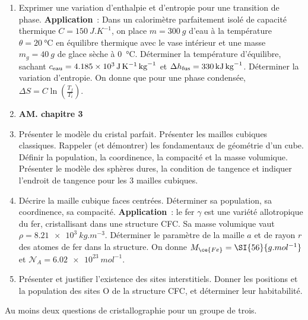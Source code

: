 \documentclass[a4paper, 11pt, final, garamond]{book}
\begin{document}
\begin{enumerate}[label=\sqenumi, resume]
  \item Exprimer une variation d'enthalpie et d'entropie pour une transition
    de phase. \textbf{Application}~: Dans un calorimètre parfaitement isolé de
    capacité thermique $C = \SI{150}{J.K^{-1}}$, on place $m = \SI{300}{g}$
    d'eau à la température $\theta = \SI{20}{\degreeCelsius}$ en équilibre
    thermique avec le vase intérieur et une masse $m_g = \SI{40}{g}$ de glace
    sèche à \SI{0}{\degreeCelsius}. Déterminer la température d'équilibre,
    sachant $c_{\rm eau} = \SI{4.185e3}{J.K^{-1}.kg^{-1}}$ et $\Delta{h_{\rm
    fus}} = \SI{330}{kJ.kg^{-1}}$. Déterminer la variation d'entropie. On
    donne que pour une phase condensée, $\Delta{S} = C \ln \left(
    \frac{T_f}{T_i} \right)$.

  \item[] \textbf{AM. chapitre 3}

  \item Présenter le modèle du cristal parfait. Présenter les mailles cubiques
    classiques. Rappeler (et démontrer) les fondamentaux de géométrie d'un cube.
    Définir la population, la coordinence, la compacité et la masse volumique.
    Présenter le modèle des sphères dures, la condition de tangence et indiquer
    l'endroit de tangence pour les 3 mailles cubiques.

  \item Décrire la maille cubique faces centrées. Déterminer sa population, sa
    coordinence, sa compacité. \textbf{Application}~: le fer $\gamma$ est une
    variété allotropique du fer, cristallisant dans une structure CFC. Sa masse
    volumique vaut $\rho = \SI{8.21e3}{kg.m^{-3}}$. Déterminer le paramètre de
    la maille $a$ et de rayon $r$ des atomes de fer dans la structure. On donne
    $M_{\ce{Fe}} = \SI{56}{g.mol^{-1}}$ et $\mathcal{N}_A =
    \SI{6.02e23}{mol^{-1}}$.

  \item Présenter et justifier l'existence des sites interstitiels. Donner les
    positions et la population des sites O de la structure CFC, et déterminer
    leur habitabilité.
\end{enumerate}

\begin{center}
  \begin{framed}
    \Huge Au moins deux questions de cristallographie pour un groupe de trois.
  \end{framed}
\end{center}
\end{document}
